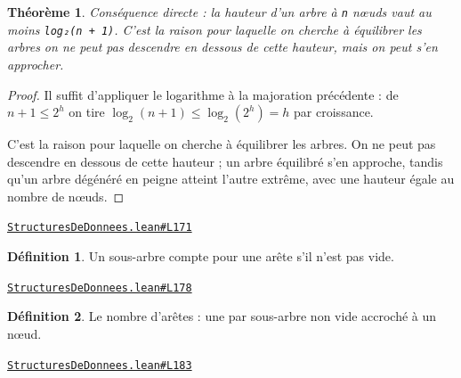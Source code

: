\documentclass[11pt,a4paper]{article}
\theoremstyle{definition}
\newtheorem{definition}{Définition}
\theoremstyle{plain}
\newtheorem{theoreme}{Théorème}
\newcommand{\source}[2]{\par\smallskip\noindent\hfill{\footnotesize\href{#1}{\texttt{#2}}}\par\smallskip}
\begin{document}
\begin{theoreme}
Conséquence directe : la hauteur d'un arbre à \texttt{n} nœuds vaut au moins
\texttt{log₂(n + 1)}. C'est la raison pour laquelle on cherche à équilibrer les arbres \textemdash{} on
ne peut pas descendre en dessous de cette hauteur, mais on peut s'en approcher.
\end{theoreme}
\begin{proof}
Il suffit d'appliquer le logarithme à la majoration précédente : de \(n + 1 \le 2^h\) on
tire \(\log_2(n+1) \le \log_2(2^h) = h\) par croissance.

C'est la raison pour laquelle on cherche à équilibrer les arbres. On ne peut pas
descendre en dessous de cette hauteur ; un arbre équilibré s'en approche, tandis qu'un
arbre dégénéré en peigne atteint l'autre extrême, avec une hauteur égale au nombre de
nœuds.
\end{proof}
\source{https://github.com/Commutator-IO/learn-lean/blob/main/courses/02-lycee/11-informatique-nsi/StructuresDeDonnees.lean\#L171}{StructuresDeDonnees.lean\#L171}

\begin{definition}
Un sous-arbre compte pour une arête s'il n'est pas vide.
\end{definition}
\source{https://github.com/Commutator-IO/learn-lean/blob/main/courses/02-lycee/11-informatique-nsi/StructuresDeDonnees.lean\#L178}{StructuresDeDonnees.lean\#L178}

\begin{definition}
Le nombre d'arêtes : une par sous-arbre non vide accroché à un nœud.
\end{definition}
\source{https://github.com/Commutator-IO/learn-lean/blob/main/courses/02-lycee/11-informatique-nsi/StructuresDeDonnees.lean\#L183}{StructuresDeDonnees.lean\#L183}
\end{document}
